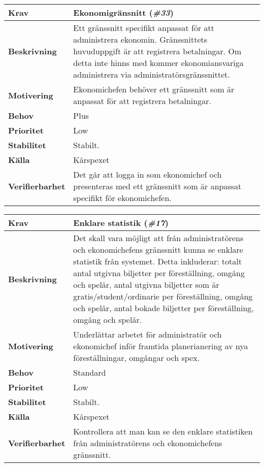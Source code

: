 \documentclass[a4paper, twoside, 11pt, titlepage]{article}
\begin{document}
		\begin{tabular} { p{2.6cm} p{12.5cm} }
			\hline
			\sffamily\textbf{Krav} & Ekonomigränsnitt (\emph{\#33})  \\
			\hline
			\sffamily\textbf{Beskrivning} & Ett gränssnitt specifikt anpassat för att administrera ekonomin. Gränssnittets huvuduppgift är att registrera betalningar. Om detta inte hinns med kommer ekonomiansvariga administrera via administratörsgränssnittet.  \\
			\hline
			\sffamily\textbf{Motivering} & Ekonomichefen behöver ett gränssnitt som är anpassat för att registrera betalningar.  \\
			\hline
			\sffamily\textbf{Behov} & Plus  \\
			\hline
			\sffamily\textbf{Prioritet} & Low  \\
			\hline
			\sffamily\textbf{Stabilitet} & Stabilt.  \\
			\hline
			\sffamily\textbf{Källa} & Kårspexet  \\
			\hline
			\sffamily\textbf{Verifierbarhet} & Det går att logga in som ekonomichef och presenteras med ett gränssnitt som är anpassat specifikt för ekonomichefen.  \\
			\hline
		\end{tabular}
		\vspace{6mm}

		\begin{tabular} { p{2.6cm} p{12.5cm} }
			\hline
			\sffamily\textbf{Krav} & Enklare statistik (\emph{\#17})  \\
			\hline
			\sffamily\textbf{Beskrivning} & Det skall vara möjligt att från administratörens och ekonomichefens gränssnitt kunna se enklare statistik från systemet. Detta inkluderar: totalt antal utgivna biljetter per föreställning, omgång och spelår, antal utgivna biljetter som är gratis/student/ordinarie per föreställning, omgång och spelår, antal bokade biljetter per föreställning, omgång och spelår.   \\
			\hline
			\sffamily\textbf{Motivering} & Underlättar arbetet för administratör och ekonomichef inför framtida planerianering av nya föreställningar, omgångar och spex.  \\
			\hline
			\sffamily\textbf{Behov} & Standard  \\
			\hline
			\sffamily\textbf{Prioritet} & Low  \\
			\hline
			\sffamily\textbf{Stabilitet} & Stabilt.  \\
			\hline
			\sffamily\textbf{Källa} & Kårspexet  \\
			\hline
			\sffamily\textbf{Verifierbarhet} & Kontrollera att man kan se den enklare statistiken från administratörens och ekonomichefens gränssnitt.  \\
			\hline
		\end{tabular}
		\vspace{6mm}
\end{document}
